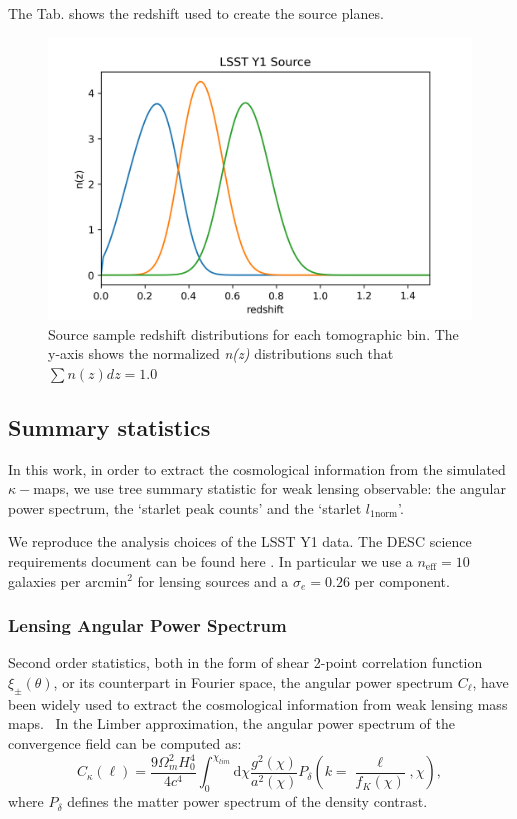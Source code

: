 \documentclass[twocolumn,twocolappendix]{aastex63}
\begin{document}
The Tab.  shows the redshift used to create the source planes.



\begin{figure}\label{photoz}
    \centering
    \includegraphics[width=\columnwidth]{paper/figures/photoz_dis.png}
    \caption{
   Source sample redshift distributions for each tomographic bin. The y-axis shows the normalized \textit{n(z)} distributions such that $\sum n(z)dz=1.0$}
    \label{fig:l1normktng_compallarc}
\end{figure}


\subsection{Summary statistics}
In this work, in order to extract the cosmological information from the simulated $\kappa-$maps, we use tree summary statistic for weak lensing observable: the angular power spectrum, the `starlet peak counts' and the `starlet $l_{1\text{norm}}$'. 

We reproduce the analysis choices of the LSST Y1 data. The DESC science requirements document can be found here \cite{mandelbaum2018lsst}.
In particular we use a $n_{\text{eff}}=10$ galaxies per $\text{arcmin}^2$ for lensing sources and a $\sigma_e=0.26$ per component.


\subsubsection{Lensing Angular Power Spectrum}
Second order statistics, both in the form of shear 2-point correlation function $\xi_{\pm}(\theta)$, or its counterpart in Fourier space, the angular power spectrum $C_{\ell}$, have been widely used to extract the cosmological information from weak lensing mass maps. \
In the Limber approximation, the angular power spectrum of the convergence field can be computed as:
\begin{equation}
    C_{\kappa}(\ell)=\frac{9\Omega_m^2H_0^4}{4c^4}
    \int_0^{\chi_{lim}} \text{d}\chi 
    \frac{g^2(\chi)}{a^2(\chi)}P_{\delta}
    	\left( k=\frac{\ell}{f_K(\chi)},\chi \right),
\end{equation}
where $P_{\delta}$ defines the matter power spectrum of the density contrast.
\end{document}
